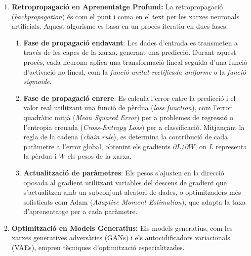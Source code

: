 \begin{enumerate}

 \item \textbf{Retropropagació en Aprenentatge Profund: } La retropropagació (\textit{backpropagation}) és com el punt i coma en el text per les xarxes neuronals artificials. Aquest algorisme es basa en un procés iteratiu en dues fases:

    \begin{enumerate}

       \item \textbf{Fase de propagació endavant}: Les dades d'entrada es transmeten a través de les capes de la xarxa, generant una predicció. Durant aquest procés, cada neurona aplica una transformació lineal seguida d'una funció d'activació no lineal, com la \textit{funció unitat rectificada uniforme} o la \textit{funció sigmoide}.


     \item \textbf{Fase de propagació enrere}: Es calcula l'error entre la predicció i el valor real utilitzant una funció de pèrdua (\textit{loss function}), com l'error quadràtic mitjà (\textit{Mean Squared Error}) per a problemes de regressió o l'entropia creuada (\textit{Cross-Entropy Loss}) per a classificació. Mitjançant la regla de la cadena (\textit{chain rule}), es determina la contribució de cada paràmetre a l'error global, obtenint els gradients $\partial L/\partial W$, on $L$ representa la pèrdua i $W$ els pesos de la xarxa.


     \item \textbf{Actualització de paràmetres}: Els pesos s'ajusten en la direcció oposada al gradient utilitzant variables del descens de gradient que s'actualitzen amb un subconjunt aleatori de dades, o optimitzadors més sofisticats com Adam (\textit{Adaptive Moment Estimation}), que adapta la taxa d'aprenentatge per a cada paràmetre.

    \end{enumerate}



 \item \textbf{Optimització en Models Generatius: } Els models generatius, com les xarxes generatives adversàries (GANs) i els autocidificadors variacionals (VAEs), empren tècniques d'optimització especialitzades.


\end{enumerate}
